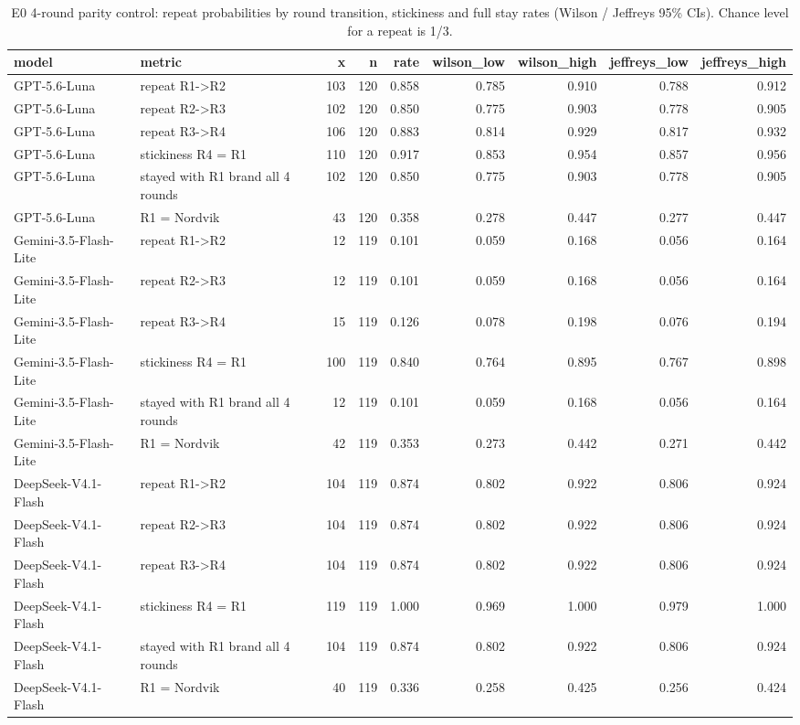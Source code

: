 \begin{table}[htbp]
\centering
\scriptsize
\caption{E0 4-round parity control: repeat probabilities by round transition, stickiness and full stay rates (Wilson / Jeffreys 95\% CIs). Chance level for a repeat is 1/3.}
\label{tab:tab04_e0_4r_repeat_dynamics}
\begin{tabular}{llrrrrrrr}
\toprule
model & metric & x & n & rate & wilson\_low & wilson\_high & jeffreys\_low & jeffreys\_high \\
\midrule
GPT-5.6-Luna & repeat R1->R2 & 103 & 120 & 0.858 & 0.785 & 0.910 & 0.788 & 0.912 \\
GPT-5.6-Luna & repeat R2->R3 & 102 & 120 & 0.850 & 0.775 & 0.903 & 0.778 & 0.905 \\
GPT-5.6-Luna & repeat R3->R4 & 106 & 120 & 0.883 & 0.814 & 0.929 & 0.817 & 0.932 \\
GPT-5.6-Luna & stickiness R4 = R1 & 110 & 120 & 0.917 & 0.853 & 0.954 & 0.857 & 0.956 \\
GPT-5.6-Luna & stayed with R1 brand all 4 rounds & 102 & 120 & 0.850 & 0.775 & 0.903 & 0.778 & 0.905 \\
GPT-5.6-Luna & R1 = Nordvik & 43 & 120 & 0.358 & 0.278 & 0.447 & 0.277 & 0.447 \\
Gemini-3.5-Flash-Lite & repeat R1->R2 & 12 & 119 & 0.101 & 0.059 & 0.168 & 0.056 & 0.164 \\
Gemini-3.5-Flash-Lite & repeat R2->R3 & 12 & 119 & 0.101 & 0.059 & 0.168 & 0.056 & 0.164 \\
Gemini-3.5-Flash-Lite & repeat R3->R4 & 15 & 119 & 0.126 & 0.078 & 0.198 & 0.076 & 0.194 \\
Gemini-3.5-Flash-Lite & stickiness R4 = R1 & 100 & 119 & 0.840 & 0.764 & 0.895 & 0.767 & 0.898 \\
Gemini-3.5-Flash-Lite & stayed with R1 brand all 4 rounds & 12 & 119 & 0.101 & 0.059 & 0.168 & 0.056 & 0.164 \\
Gemini-3.5-Flash-Lite & R1 = Nordvik & 42 & 119 & 0.353 & 0.273 & 0.442 & 0.271 & 0.442 \\
DeepSeek-V4.1-Flash & repeat R1->R2 & 104 & 119 & 0.874 & 0.802 & 0.922 & 0.806 & 0.924 \\
DeepSeek-V4.1-Flash & repeat R2->R3 & 104 & 119 & 0.874 & 0.802 & 0.922 & 0.806 & 0.924 \\
DeepSeek-V4.1-Flash & repeat R3->R4 & 104 & 119 & 0.874 & 0.802 & 0.922 & 0.806 & 0.924 \\
DeepSeek-V4.1-Flash & stickiness R4 = R1 & 119 & 119 & 1.000 & 0.969 & 1.000 & 0.979 & 1.000 \\
DeepSeek-V4.1-Flash & stayed with R1 brand all 4 rounds & 104 & 119 & 0.874 & 0.802 & 0.922 & 0.806 & 0.924 \\
DeepSeek-V4.1-Flash & R1 = Nordvik & 40 & 119 & 0.336 & 0.258 & 0.425 & 0.256 & 0.424 \\
\bottomrule
\end{tabular}
\end{table}